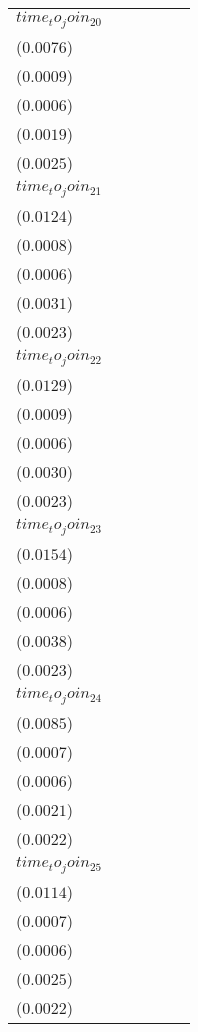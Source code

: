 \begin{tabular}{llllll}
$time_to_join_20$  &   \makecell{$0.0066^{}$ \\ ($0.0076$)} &  \makecell{$-0.0004^{}$ \\ ($0.0009$)} &  \makecell{$-0.0005^{}$ \\ ($0.0006$)} &   \makecell{$0.0019^{}$ \\ ($0.0019$)} &   \makecell{$0.0023^{}$ \\ ($0.0025$)} \\
$time_to_join_21$  &   \makecell{$0.0123^{}$ \\ ($0.0124$)} &  \makecell{$-0.0001^{}$ \\ ($0.0008$)} &  \makecell{$-0.0004^{}$ \\ ($0.0006$)} &   \makecell{$0.0034^{}$ \\ ($0.0031$)} &   \makecell{$0.0019^{}$ \\ ($0.0023$)} \\
$time_to_join_22$  &   \makecell{$0.0114^{}$ \\ ($0.0129$)} &  \makecell{$-0.0003^{}$ \\ ($0.0009$)} &  \makecell{$-0.0005^{}$ \\ ($0.0006$)} &   \makecell{$0.0030^{}$ \\ ($0.0030$)} &   \makecell{$0.0019^{}$ \\ ($0.0023$)} \\
$time_to_join_23$  &   \makecell{$0.0130^{}$ \\ ($0.0154$)} &  \makecell{$-0.0003^{}$ \\ ($0.0008$)} &  \makecell{$-0.0005^{}$ \\ ($0.0006$)} &   \makecell{$0.0035^{}$ \\ ($0.0038$)} &   \makecell{$0.0019^{}$ \\ ($0.0023$)} \\
$time_to_join_24$  &   \makecell{$0.0061^{}$ \\ ($0.0085$)} &  \makecell{$-0.0005^{}$ \\ ($0.0007$)} &  \makecell{$-0.0005^{}$ \\ ($0.0006$)} &   \makecell{$0.0019^{}$ \\ ($0.0021$)} &   \makecell{$0.0017^{}$ \\ ($0.0022$)} \\
$time_to_join_25$  &   \makecell{$0.0093^{}$ \\ ($0.0114$)} &  \makecell{$-0.0003^{}$ \\ ($0.0007$)} &  \makecell{$-0.0004^{}$ \\ ($0.0006$)} &   \makecell{$0.0025^{}$ \\ ($0.0025$)} &   \makecell{$0.0016^{}$ \\ ($0.0022$)} \\

\end{tabular}
